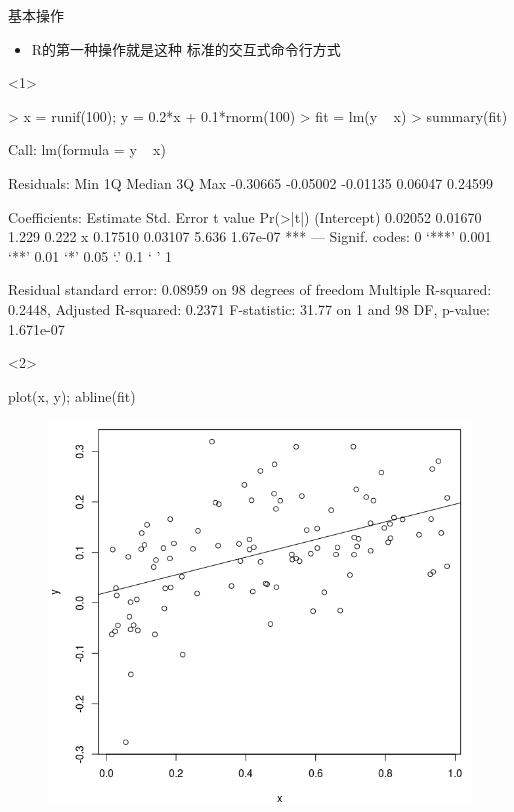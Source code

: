 \documentclass{beamerthemeMono}
\begin{document}
\begin{frame}[t, fragile]{\subsecname}{基本操作}
\begin{itemize}
  \item R的第一种操作就是这种
             标准的交互式命令行方式  
\end{itemize} 

\begin{overlayarea}{\textwidth}{\textheight}
\begin{onlyenv}<1>
\begin{rcode}
> x = runif(100); y = 0.2*x + 0.1*rnorm(100)
> fit = lm(y ~ x)
> summary(fit)

Call:
lm(formula = y ~ x)

Residuals:
     Min       1Q   Median       3Q      Max 
-0.30665 -0.05002 -0.01135  0.06047  0.24599 

Coefficients:
            Estimate Std. Error t value Pr(>|t|)    
(Intercept)  0.02052    0.01670   1.229    0.222    
x            0.17510    0.03107   5.636 1.67e-07 ***
---
Signif. codes:  0 ‘***’ 0.001 ‘**’ 0.01 ‘*’ 0.05 ‘.’ 0.1 ‘ ’ 1

Residual standard error: 0.08959 on 98 degrees of freedom
Multiple R-squared:  0.2448,    Adjusted R-squared:  0.2371 
F-statistic: 31.77 on 1 and 98 DF,  p-value: 1.671e-07
\end{rcode}
\end{onlyenv}

\begin{onlyenv}<2>
\begin{rcode}
plot(x, y); abline(fit)
\end{rcode}
\begin{figure}
    \centering
    \includegraphics[width=0.55\columnwidth]{R_output.png}
\end{figure}
\end{onlyenv}
\end{overlayarea}
\end{frame}
\end{document}
